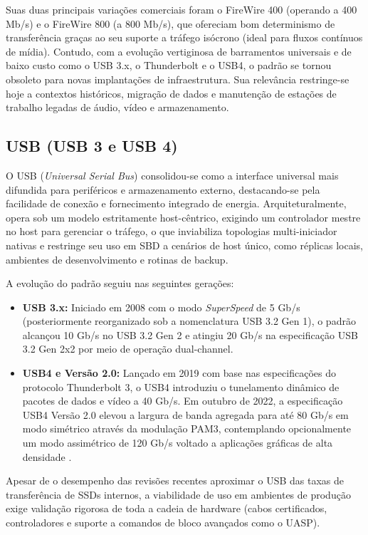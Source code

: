 \documentclass[11pt,a4paper]{article}
\begin{document}
Suas duas principais variações comerciais foram o FireWire 400 (operando a 400 Mb/s) e o FireWire 800 (a 800 Mb/s), que ofereciam bom determinismo de transferência graças ao seu suporte a tráfego isócrono (ideal para fluxos contínuos de mídia). Contudo, com a evolução vertiginosa de barramentos universais e de baixo custo como o USB 3.x, o Thunderbolt e o USB4, o padrão se tornou obsoleto para novas implantações de infraestrutura. Sua relevância restringe-se hoje a contextos históricos, migração de dados e manutenção de estações de trabalho legadas de áudio, vídeo e armazenamento.

\subsection{USB (USB 3 e USB 4)}

O USB (\emph{Universal Serial Bus}) consolidou-se como a interface universal mais difundida para periféricos e armazenamento externo, destacando-se pela facilidade de conexão e fornecimento integrado de energia. Arquiteturalmente, opera sob um modelo estritamente host-cêntrico, exigindo um controlador mestre no host para gerenciar o tráfego, o que inviabiliza topologias multi-iniciador nativas e restringe seu uso em SBD a cenários de host único, como réplicas locais, ambientes de desenvolvimento e rotinas de backup.

A evolução do padrão seguiu nas seguintes gerações:
\begin{itemize}[leftmargin=*]
\item \textbf{USB 3.x:} Iniciado em 2008 com o modo \emph{SuperSpeed} de 5 Gb/s (posteriormente reorganizado sob a nomenclatura USB 3.2 Gen 1), o padrão alcançou 10 Gb/s no USB 3.2 Gen 2 e atingiu 20 Gb/s na especificação USB 3.2 Gen 2x2 por meio de operação dual-channel.
\item \textbf{USB4 e Versão 2.0:} Lançado em 2019 com base nas especificações do protocolo Thunderbolt 3, o USB4 introduziu o tunelamento dinâmico de pacotes de dados e vídeo a 40 Gb/s. Em outubro de 2022, a especificação USB4 Versão 2.0 elevou a largura de banda agregada para até 80 Gb/s em modo simétrico através da modulação PAM3, contemplando opcionalmente um modo assimétrico de 120 Gb/s voltado a aplicações gráficas de alta densidade \cite{usbif}.
\end{itemize}

Apesar de o desempenho das revisões recentes aproximar o USB das taxas de transferência de SSDs internos, a viabilidade de uso em ambientes de produção exige validação rigorosa de toda a cadeia de hardware (cabos certificados, controladores e suporte a comandos de bloco avançados como o UASP).
\end{document}
